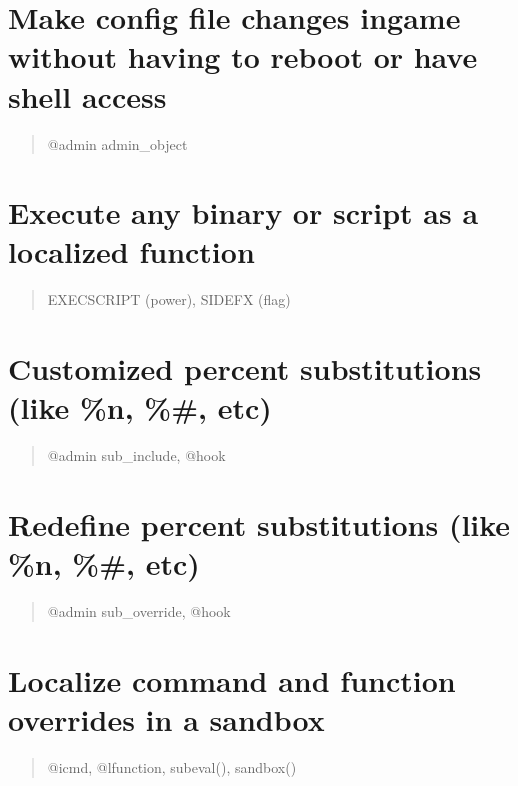 \documentclass[letterpaper,10pt,english]{sphinxmanual}
\begin{document}
\section{Make config file changes in\sphinxhyphen{}game without having to reboot or have shell access}
\label{\detokenize{01-intro:make-config-file-changes-in-game-without-having-to-reboot-or-have-shell-access}}\begin{quote}

\sphinxAtStartPar
@admin admin\_object
\end{quote}


\section{Execute any binary or script as a localized function}
\label{\detokenize{01-intro:execute-any-binary-or-script-as-a-localized-function}}\begin{quote}

\sphinxAtStartPar
EXECSCRIPT (power), SIDEFX (flag)
\end{quote}


\section{Customized percent substitutions (like \%n, \%\#, etc)}
\label{\detokenize{01-intro:customized-percent-substitutions-like-n-etc}}\begin{quote}

\sphinxAtStartPar
@admin sub\_include, @hook
\end{quote}


\section{Redefine percent substitutions (like \%n, \%\#, etc)}
\label{\detokenize{01-intro:redefine-percent-substitutions-like-n-etc}}\begin{quote}

\sphinxAtStartPar
@admin sub\_override, @hook
\end{quote}


\section{Localize command and function overrides in a sandbox}
\label{\detokenize{01-intro:localize-command-and-function-overrides-in-a-sandbox}}\begin{quote}

\sphinxAtStartPar
@icmd, @lfunction, subeval(), sandbox()
\end{quote}
\end{document}
